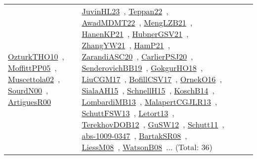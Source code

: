 {\begin{longtable}{lp{3cm}>{\raggedright\arraybackslash}p{6cm}>{\raggedright\arraybackslash}p{6cm}>{\raggedright\arraybackslash}p{8cm}}
\href{../works/OzturkTHO10.pdf}{OzturkTHO10}~\cite{OzturkTHO10}, \href{../works/MoffittPP05.pdf}{MoffittPP05}~\cite{MoffittPP05}, \href{../works/Muscettola02.pdf}{Muscettola02}~\cite{Muscettola02}, \href{../works/SourdN00.pdf}{SourdN00}~\cite{SourdN00}, \href{../works/ArtiguesR00.pdf}{ArtiguesR00}~\cite{ArtiguesR00} & \href{../works/JuvinHL23.pdf}{JuvinHL23}~\cite{JuvinHL23}, \href{../works/Teppan22.pdf}{Teppan22}~\cite{Teppan22}, \href{../works/AwadMDMT22.pdf}{AwadMDMT22}~\cite{AwadMDMT22}, \href{../works/MengLZB21.pdf}{MengLZB21}~\cite{MengLZB21}, \href{../works/HanenKP21.pdf}{HanenKP21}~\cite{HanenKP21}, \href{../works/HubnerGSV21.pdf}{HubnerGSV21}~\cite{HubnerGSV21}, \href{../works/ZhangYW21.pdf}{ZhangYW21}~\cite{ZhangYW21}, \href{../works/HamP21.pdf}{HamP21}~\cite{HamP21}, \href{../works/ZarandiASC20.pdf}{ZarandiASC20}~\cite{ZarandiASC20}, \href{../works/CarlierPSJ20.pdf}{CarlierPSJ20}~\cite{CarlierPSJ20}, \href{../works/SenderovichBB19.pdf}{SenderovichBB19}~\cite{SenderovichBB19}, \href{../works/GokgurHO18.pdf}{GokgurHO18}~\cite{GokgurHO18}, \href{../works/LiuCGM17.pdf}{LiuCGM17}~\cite{LiuCGM17}, \href{../works/BofillCSV17.pdf}{BofillCSV17}~\cite{BofillCSV17}, \href{../works/OrnekO16.pdf}{OrnekO16}~\cite{OrnekO16}, \href{../works/SialaAH15.pdf}{SialaAH15}~\cite{SialaAH15}, \href{../works/SchnellH15.pdf}{SchnellH15}~\cite{SchnellH15}, \href{../works/KoschB14.pdf}{KoschB14}~\cite{KoschB14}, \href{../works/LombardiMB13.pdf}{LombardiMB13}~\cite{LombardiMB13}, \href{../works/MalapertCGJLR13.pdf}{MalapertCGJLR13}~\cite{MalapertCGJLR13}, \href{../works/SchuttFSW13.pdf}{SchuttFSW13}~\cite{SchuttFSW13}, \href{../works/Letort13.pdf}{Letort13}~\cite{Letort13}, \href{../works/TerekhovDOB12.pdf}{TerekhovDOB12}~\cite{TerekhovDOB12}, \href{../works/GuSW12.pdf}{GuSW12}~\cite{GuSW12}, \href{../works/Schutt11.pdf}{Schutt11}~\cite{Schutt11}, \href{../works/abs-1009-0347.pdf}{abs-1009-0347}~\cite{abs-1009-0347}, \href{../works/BartakSR08.pdf}{BartakSR08}~\cite{BartakSR08}, \href{../works/LiessM08.pdf}{LiessM08}~\cite{LiessM08}, \href{../works/WatsonB08.pdf}{WatsonB08}~\cite{WatsonB08}... (Total: 36)\\

\end{longtable}}
